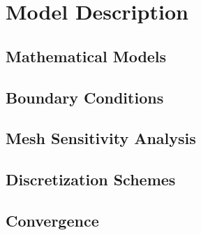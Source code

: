 \section{Model Description}

\subsection{Mathematical Models}

\subsection{Boundary Conditions}

\subsection{Mesh Sensitivity Analysis}

\subsection{Discretization Schemes}

\subsection{Convergence}